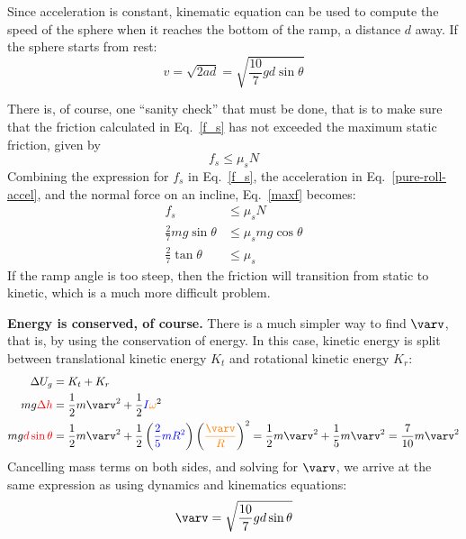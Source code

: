 \documentclass{../../oss-handout}
\begin{document}
Since acceleration is constant, kinematic equation can be used to compute the
speed of the sphere when it reaches the bottom of the ramp, a distance $d$ away.
If the sphere starts from rest:
\begin{equation}
  v=\sqrt{2ad}=\sqrt{\frac{10}{7}gd\sin\theta}
\end{equation}

There is, of course, one ``sanity check'' that must be done, that is to make
sure that the friction calculated in Eq.~\ref{f_s} has not exceeded the maximum
static friction, given by
\begin{equation}
  f_s\leq\mu_s N
  \label{maxf}
\end{equation}
Combining the expression for $f_s$ in Eq.~\ref{f_s}, the acceleration in
Eq.~\ref{pure-roll-accel}, and the normal force on an incline, Eq.~\ref{maxf}
becomes:
\begin{align}
  f_s&\leq\mu_sN\\
  \frac27mg\sin\theta&\leq\mu_smg\cos\theta\\
  \frac27\tan\theta&\leq\mu_s
\end{align}
If the ramp angle is too steep, then the friction will transition from static
to kinetic, which is a much more difficult problem.

\textbf{Energy is conserved, of course.} There is a much simpler way to find
$\varv$, that is, by using the conservation of energy. In this case, kinetic
energy is split between translational kinetic energy $K_t$ and rotational
kinetic energy $K_r$:
\begin{align*}
  \Delta U_g&=K_t+K_r\\
  mg\textcolor{red}{\Delta h}&=\frac12 m\varv^2+
  \frac12
  \textcolor{blue}{I}\textcolor{orange}{\omega}^2\\
  mg\textcolor{red}{d\sin\theta}&=\frac12 m\varv^2+\frac12
  \left(\textcolor{blue}{\frac25 mR^2}\right)
  \left(\textcolor{orange}{\frac{\varv}R}\right)^2
  =\frac12 m\varv^2+\frac15m\varv^2=\frac7{10}m\varv^2
\end{align*}
Cancelling mass terms on both sides, and solving for $\varv$, we arrive at
the same expression as using dynamics and kinematics equations:
\begin{equation}
  \varv=\sqrt{\frac{10}{7}gd\sin\theta}
\end{equation}
\end{document}
